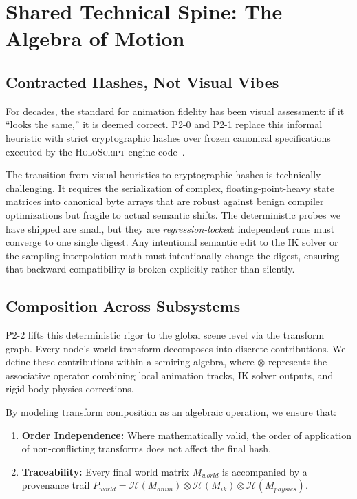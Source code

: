 \documentclass[sigconf,nonacm]{acmart}
\newcommand{\holoscript}{\textsc{HoloScript}}
\newcommand{\hashfn}{\mathcal{H}}
\newcommand{\tropmult}{\otimes}
\begin{document}
\section{Shared Technical Spine: The Algebra of Motion}

\subsection{Contracted Hashes, Not Visual Vibes}
For decades, the standard for animation fidelity has been visual assessment: if it ``looks the same,'' it is deemed correct. P2-0 and P2-1 replace this informal heuristic with strict cryptographic hashes over frozen canonical specifications executed by the \holoscript{} engine code~\cite{paper-6-anim-sca2027,paper-7-ik-siggraph2027}. 

The transition from visual heuristics to cryptographic hashes is technically challenging. It requires the serialization of complex, floating-point-heavy state matrices into canonical byte arrays that are robust against benign compiler optimizations but fragile to actual semantic shifts. The deterministic probes we have shipped are small, but they are \emph{regression-locked}: independent runs must converge to one single digest. Any intentional semantic edit to the IK solver or the sampling interpolation math must intentionally change the digest, ensuring that backward compatibility is broken explicitly rather than silently.

\subsection{Composition Across Subsystems}
P2-2 lifts this deterministic rigor to the global scene level via the transform graph. Every node's world transform decomposes into discrete contributions. We define these contributions within a semiring algebra, where $\tropmult$ represents the associative operator combining local animation tracks, IK solver outputs, and rigid-body physics corrections. 

By modeling transform composition as an algebraic operation, we ensure that:
\begin{enumerate}
    \item \textbf{Order Independence:} Where mathematically valid, the order of application of non-conflicting transforms does not affect the final hash.
    \item \textbf{Traceability:} Every final world matrix $M_{world}$ is accompanied by a provenance trail $P_{world} = \hashfn(M_{anim}) \tropmult \hashfn(M_{ik}) \tropmult \hashfn(M_{physics})$.
\end{enumerate}
\end{document}
